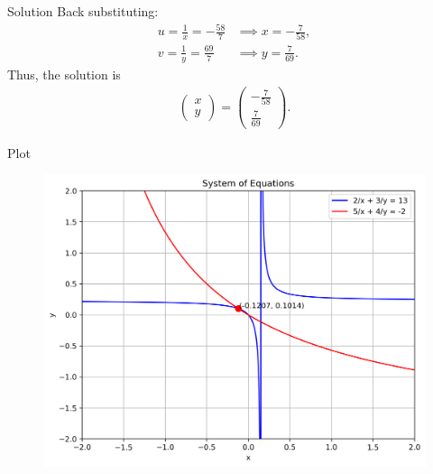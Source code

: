 \documentclass{beamer}
\newcommand{\myvec}[1]{\ensuremath{\begin{pmatrix}#1\end{pmatrix}}}
\begin{document}
\begin{frame}{Solution}
Back substituting:
\begin{align}
	u = \frac{1}{x} = -\frac{58}{7} &\implies x = -\frac{7}{58}, \\
	v = \frac{1}{y} = \frac{69}{7} &\implies y = \frac{7}{69}.
\end{align}
Thus, the solution is
\begin{align}
	\myvec{x \\ y} = \myvec{-\tfrac{7}{58} \\ \tfrac{7}{69}}.
\end{align}
\end{frame}
\begin{frame}{Plot}
\begin{figure}[H]
	\centering
	\includegraphics[width=1\linewidth]{../figs/equation_plot}
	\caption{}
	\label{fig:equationplot}
\end{figure}

\end{frame}
\end{document}
